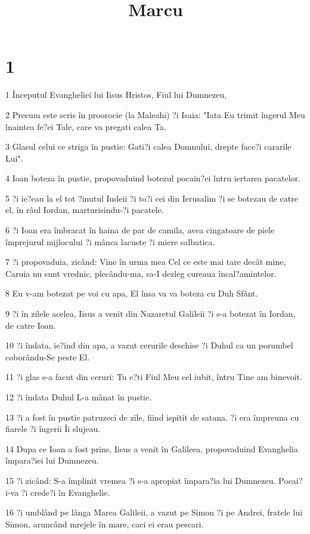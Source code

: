 

\title{Marcu}


\chapter{1}

\par 1 Începutul Evangheliei lui Iisus Hristos, Fiul lui Dumnezeu,
\par 2 Precum este scris în proorocie (la Maleahi) ?i Isaia: "Iata Eu trimit îngerul Meu înaintea fe?ei Tale, care va pregati calea Ta.
\par 3 Glasul celui ce striga în pustie: Gati?i calea Domnului, drepte face?i cararile Lui".
\par 4 Ioan boteza în pustie, propovaduind botezul pocain?ei întru iertarea pacatelor.
\par 5 ?i ie?eau la el tot ?inutul Iudeii ?i to?i cei din Ierusalim ?i se botezau de catre el, în râul Iordan, marturisindu-?i pacatele.
\par 6 ?i Ioan era îmbracat în haina de par de camila, avea cingatoare de piele împrejurul mijlocului ?i mânca lacuste ?i miere salbatica.
\par 7 ?i propovaduia, zicând: Vine în urma mea Cel ce este mai tare decât mine, Caruia nu sunt vrednic, plecându-ma, sa-I dezleg cureaua încal?amintelor.
\par 8 Eu v-am botezat pe voi cu apa, El însa va va boteza cu Duh Sfânt.
\par 9 ?i în zilele acelea, Iisus a venit din Nazaretul Galileii ?i s-a botezat în Iordan, de catre Ioan.
\par 10 ?i îndata, ie?ind din apa, a vazut cerurile deschise ?i Duhul ca un porumbel coborându-Se peste El.
\par 11 ?i glas s-a facut din ceruri: Tu e?ti Fiul Meu cel iubit, întru Tine am binevoit.
\par 12 ?i îndata Duhul L-a mânat în pustie.
\par 13 ?i a fost în pustie patruzeci de zile, fiind ispitit de satana. ?i era împreuna cu fiarele ?i îngerii Îi slujeau.
\par 14 Dupa ce Ioan a fost prins, Iisus a venit în Galileea, propovaduind Evanghelia împara?iei lui Dumnezeu.
\par 15 ?i zicând: S-a împlinit vremea ?i s-a apropiat împara?ia lui Dumnezeu. Pocai?i-va ?i crede?i în Evanghelie.
\par 16 ?i umblând pe lânga Marea Galileii, a vazut pe Simon ?i pe Andrei, fratele lui Simon, aruncând mrejele în mare, caci ei erau pescari.
